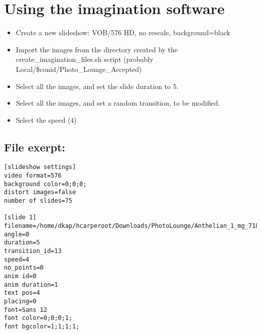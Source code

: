 \documentclass[captions=tablesignature]{scrartcl}
\begin{document}
\section{Using the imagination software}
\label{sec-6}
\begin{itemize}
\item Create a new slideshow: VOB/576 HD, no rescale, background=black
\item Import the images from the directory created by the
create\_imagination\_files.sh script (probably
Local/\$conid/Photo\_Lounge\_Accepted)
\item Select all the images, and set the slide duration to 5.
\item Select all the images, and set a random transition, to be
modified.
\item Select the speed (4)
\end{itemize}
\subsection{File exerpt:}
\label{sec-6-1}
\begin{verbatim}
[slideshow settings]
video format=576
background color=0;0;0;
distort images=false
number of slides=75

[slide 1]
filename=/home/dkap/hcarperoot/Downloads/PhotoLounge/Anthelian_1_mg_7182a.jpg
angle=0
duration=5
transition_id=13
speed=4
no_points=0
anim id=0
anim duration=1
text pos=4
placing=0
font=Sans 12
font color=0;0;0;1;
font bgcolor=1;1;1;1;
\end{verbatim}
\end{document}
